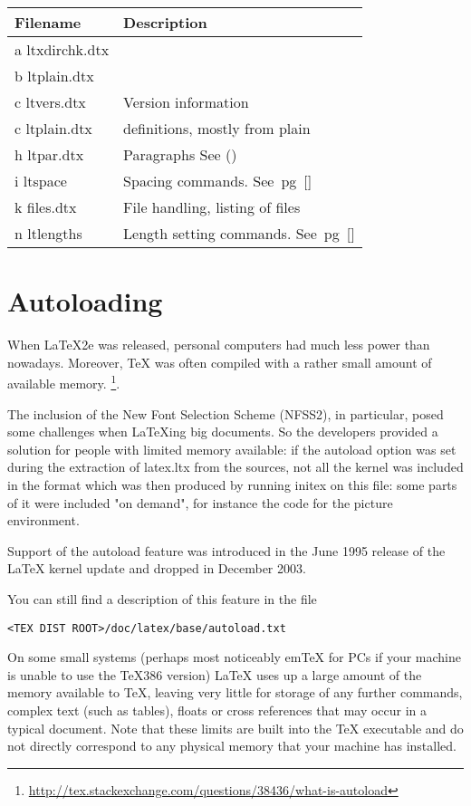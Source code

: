 {\RaggedRight
\centering

\begin{tabular}{lp{5cm}}
\toprule
Filename  				& Description \\
\midrule
a ltxdirchk.dtx 	&        \\
b ltplain.dtx    	&        \\
c ltvers.dtx     	& Version information       \\
c ltplain.dtx    	& definitions, mostly from plain\\
h ltpar.dtx      	& Paragraphs See (\pageref{pars})\\
i  ltspace				&Spacing commands. See~pg~[\pageref{spc}]\\
k files.dtx				& File handling, listing of files\\
n ltlengths				& Length setting commands. See~pg~[\pageref{kernel:lengths}]\\
\bottomrule
\end{tabular}
}

\section{Autoloading}

When LaTeX2e was released, personal computers had much less power than nowadays. Moreover, TeX was often compiled with a rather small amount of available memory.
\footnote{\url{http://tex.stackexchange.com/questions/38436/what-is-autoload}}.

The inclusion of the New Font Selection Scheme (NFSS2), in particular, posed some challenges when LaTeXing big documents. So the developers provided a solution for people with limited memory available: if the autoload option was set during the extraction of latex.ltx from the sources, not all the kernel was included in the format which was then produced by running initex on this file: some parts of it were included "on demand", for instance the code for the picture environment.

Support of the autoload feature was introduced in the June 1995 release of the LaTeX kernel update and dropped in December 2003.

You can still find a description of this feature in the file

\begin{verbatim}
<TEX DIST ROOT>/doc/latex/base/autoload.txt
\end{verbatim}

On some small systems (perhaps most noticeably emTeX for PCs if your machine is unable to use the TeX386 version) LaTeX uses up a large amount of the memory available to TeX, leaving very little for storage of any further commands, complex text (such as tables), floats or cross references that may occur in a typical document. Note that these limits are built into the TeX executable and do not directly correspond to any physical memory that your machine has installed.

